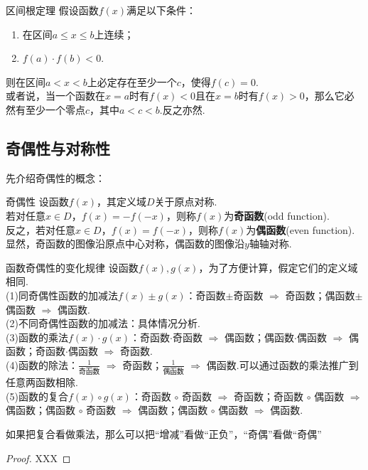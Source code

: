 \documentclass[lang=cn, zihao=5]{elegantbook}
\begin{document}
\begin{theorem}{区间根定理}
    假设函数$f(x)$满足以下条件：
    \begin{enumerate}
        \item 在区间$a \leq x \leq b$上连续；
        \item $f(a) \cdot f(b)<0$.
    \end{enumerate}
    则在区间$a<x<b$上必定存在至少一个$c$，使得$f(c)=0$.\\
    或者说，当一个函数在$x=a$时有$f(x)<0$且在$x=b$时有$f(x)>0$，那么它必然有至少一个零点$c$，其中$a<c<b$.反之亦然.
\end{theorem}

\subsection{奇偶性与对称性}

先介绍奇偶性的概念：

\begin{definition}{奇偶性} %
    设函数$f(x)$，其定义域$D$关于原点对称.\\
    若对任意$x \in D$，$f(x)=-f(-x)$，则称$f(x)$为\textbf{奇函数}(odd function).\\
    反之，若对任意$x \in D$，$f(x)=f(-x)$，则称$f(x)$为\textbf{偶函数}(even function).\\
    显然，奇函数的图像沿原点中心对称，偶函数的图像沿$y$轴轴对称.
\end{definition}

\begin{proposition}{函数奇偶性的变化规律}
    设函数$f(x),g(x)$，为了方便计算，假定它们的定义域相同.\\
    (1)同奇偶性函数的加减法$f(x) \pm g(x)$：奇函数$\pm$奇函数 $\Rightarrow$ 奇函数；偶函数$\pm$偶函数 $\Rightarrow$ 偶函数.\\
    (2)不同奇偶性函数的加减法：具体情况分析.\\
    (3)函数的乘法$f(x) \cdot g(x)$：奇函数$\cdot$奇函数 $\Rightarrow$ 偶函数；偶函数$\cdot$偶函数 $\Rightarrow$ 偶函数；奇函数$\cdot$偶函数 $\Rightarrow$ 奇函数.\\
    (4)函数的除法：$\frac{1}{\text{奇函数}}$ $\Rightarrow$ 奇函数；$\frac{1}{\text{偶函数}}$ $\Rightarrow$ 偶函数.可以通过函数的乘法推广到任意两函数相除.\\
    (5)函数的复合$f(x) \circ g(x)$：奇函数 $\circ$ 奇函数 $\Rightarrow$ 奇函数；奇函数 $\circ$ 偶函数 $\Rightarrow$ 偶函数；偶函数 $\circ$ 奇函数 $\Rightarrow$ 偶函数；偶函数 $\circ$ 偶函数 $\Rightarrow$ 偶函数.
\end{proposition}
\begin{remark}
	如果把复合看做乘法，那么可以把“增减”看做“正负”，“奇偶”看做“奇偶”
\end{remark}
\begin{proof}
    XXX
\end{proof}
\end{document}
